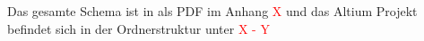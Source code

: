 Das gesamte Schema ist in als PDF im Anhang \textcolor{red}{X} und das Altium Projekt befindet sich in der Ordnerstruktur unter \textcolor{red}{X - Y}










